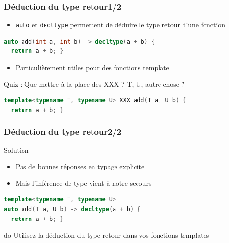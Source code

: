 \documentclass[C++.tex]{subfiles}
\begin{document}
\begin{frame}[fragile]
	\frametitle{Déduction du type retour\titlehfill{}1/2}
	\begin{itemize}
		\item \lstinline|auto| et \lstinline|decltype| permettent de déduire le type retour d'une fonction
	\end{itemize}

	\begin{lstlisting}[language=C++]
auto add(int a, int b) -> decltype(a + b) {
  return a + b; }\end{lstlisting}

	\begin{itemize}
		\item Particulièrement utiles pour des fonctions template
	\end{itemize}

	\begin{block}{Quiz : Que mettre à la place des XXX ? T, U, autre chose ?}
		\begin{lstlisting}[language=C++]
template<typename T, typename U> XXX add(T a, U b) {
  return a + b; }\end{lstlisting}

	\end{block}
\end{frame}

\begin{frame}[fragile]
	\frametitle{Déduction du type retour\titlehfill{}2/2}
	\begin{block}{Solution}
		\begin{itemize}
			\item Pas de bonnes réponses en typage explicite
			\item Mais l'inférence de type vient à notre secours
		\end{itemize}
	\end{block}

	\begin{lstlisting}[language=C++]
template<typename T, typename U>
auto add(T a, U b) -> decltype(a + b) {
  return a + b; }\end{lstlisting}

	\begin{exampleblock}{do}
		Utilisez la déduction du type retour dans vos fonctions templates
	\end{exampleblock}
\end{frame}
\end{document}

